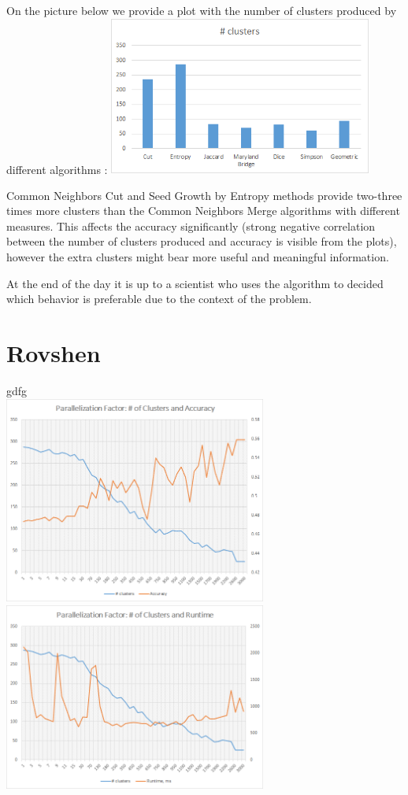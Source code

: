 \documentclass[journal]{IEEEtran}
\begin{document}
On the picture below we provide a plot with the number of clusters produced by different algorithms :
\includegraphics[width=3.4in,clip,keepaspectratio]{num-clusters}\

Common Neighbors Cut and Seed Growth by Entropy methods provide two-three times more clusters than the Common Neighbors Merge algorithms with different measures. This affects the accuracy significantly (strong negative correlation between the number of clusters produced and accuracy is visible from the plots), however the extra clusters might bear more useful and meaningful information. 

At the end of the day it is up to a scientist who uses the algorithm to decided which behavior is preferable due to the context of the problem.

\section{Rovshen}
gdfg\\
\includegraphics[width=3.4in,clip,keepaspectratio]{clusters-accuracy-parallel}
\includegraphics[width=3.4in,clip,keepaspectratio]{clusters-runtime-parallel}
\end{document}
